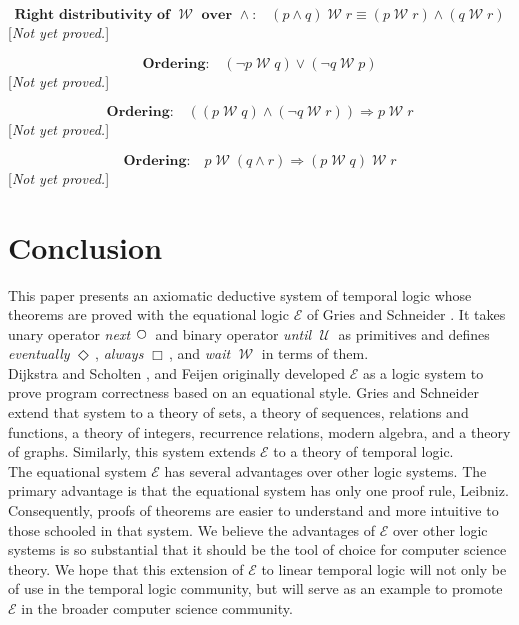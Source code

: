 \documentclass[fleqn, leqno]{article}
\newcommand{\impl}{\ensuremath{\Rightarrow}}        %
\newcommand{\Until}{\;\mathcal{U}\;}
\newcommand{\Wait}{\;\mathcal{W}\;}
\newcommand{\Next}{\;\,\text{\raisebox{3.5pt}{\circle{6}}}}
\newcommand{\Event}{\Diamond\,}
\newcommand{\Always}{\Box\,}
\begin{document}
\begin{equation}\label{E:rightWaitAndDist}
\textbf{Right distributivity of $\Wait$ over $\land$:}\quad (p \land q) \Wait r \equiv (p \Wait r) \land (q \Wait r)
\end{equation}
[\textit{Not yet proved.}]

\begin{equation}\label{E:waitOrdering}
\textbf{Ordering:}\quad (\neg p \Wait q) \lor (\neg q \Wait p)
\end{equation}
[\textit{Not yet proved.}]

\begin{equation}\label{E:waitOrderingTwo}
\textbf{Ordering:}\quad ((p \Wait q) \land (\neg q \Wait r)) \impl p \Wait r
\end{equation}
[\textit{Not yet proved.}]

\begin{equation}\label{E:waitOrderingThree}
\textbf{Ordering:}\quad p \Wait (q \land r) \impl (p \Wait q) \Wait r
\end{equation}
[\textit{Not yet proved.}]

\section{Conclusion}

This paper presents an axiomatic deductive system of temporal logic whose theorems are proved with the equational
logic $\mathcal{E}$ of Gries and Schneider \cite{LADM}.
It takes unary operator \textit{next} $\Next$ and binary operator \textit{until} $\Until$ as primitives and defines
\textit{eventually} $\Event$, \textit{always} $\Always$, and \textit{wait} $\Wait$ in terms of them.\\

Dijkstra and Scholten \cite{DandS}, and Feijen \cite{Feij} originally developed $\mathcal{E}$ as a logic system to prove
program correctness based on an equational style.
Gries and Schneider extend that system to a theory of sets, a theory of sequences,
relations and functions, a theory of integers, recurrence relations, modern algebra, and a theory of graphs.
Similarly, this system extends $\mathcal{E}$ to a theory of temporal logic.\\

The equational system $\mathcal{E}$ has several advantages over other logic systems.
The primary advantage is that the equational system has only one proof rule, Leibniz.
Consequently, proofs of theorems are easier to understand and more intuitive to those schooled in that system. 
We believe the advantages of $\mathcal{E}$ over other logic systems is so substantial that it should be the
tool of choice for computer science theory.
We hope that this extension of $\mathcal{E}$ to linear temporal logic will not only be of use in the
temporal logic community, but will serve as an example to promote $\mathcal{E}$ in the broader computer science community.



\end{document}
